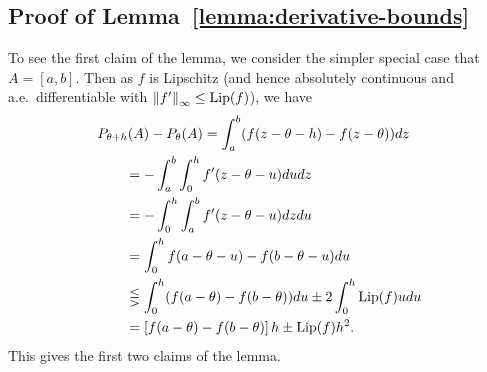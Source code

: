 




\subsection{Proof of Lemma~\ref{lemma:derivative-bounds}}
\label{sec:proof-derivative-bounds}

To see the first claim of the lemma, we consider the simpler special case
that $A = [a, b]$. Then as $f$ is Lipschitz (and hence absolutely
continuous and a.e.\ differentiable with $\left\|{f'}\right\|_\infty \le {\rm \textup{Lip}}(f)$),
we have
\begin{align*}
  & P_{\theta + h}(A)
  - P_\theta(A)
   = \int_a^b (f(z - \theta - h) - f(z - \theta)) dz \\
  & \qquad = -\int_a^b \int_0^h f'(z - \theta - u) du dz \\
  & \qquad = -\int_0^h \int_a^b f'(z - \theta - u) dz du \\
  & \qquad = \int_0^h f(a - \theta - u) - f(b - \theta - u) du \\
  & \qquad \lesseqgtr \int_0^h (f(a - \theta) - f(b - \theta)) du
  \pm 2 \int_0^h {\rm \textup{Lip}}(f) u du \\
  & \qquad = \left[f(a - \theta) - f(b - \theta)\right] h \pm {\rm \textup{Lip}}(f) h^2.
\end{align*}
This gives the first two claims of the lemma.

